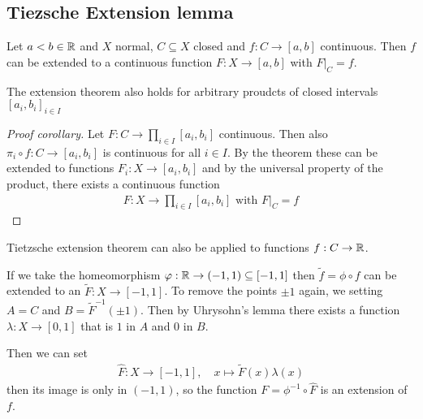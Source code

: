 \subsection{Tiezsche Extension lemma}

\begin{thm}
  Let $a < b \in \mathbb{R}$ and $X$ normal, $C \subseteq X$ closed and $f: C \to [a,b]$ continuous.
  Then $f$ can be extended to a continuous function $F:X \to [a,b]$ with $F|_C = f$.
\end{thm}
\begin{cor}[]
  The extension theorem also holds for arbitrary proudcts of closed intervals $[a_i,b_i]_{i \in I}$
\end{cor}

\begin{proof}[Proof corollary]
  Let $F: C \to \prod_{i \in I}[a_i,b_i]$ continuous.
  Then also $\pi_i \circ f: C \to [a_i,b_i]$ is continuous for all $i \in I$. 
  By the theorem these can be extended to functions $F_i: X \to  [a_i,b_i]$ and by the universal property of the product, there exists a continuous function
  \begin{align*}
    F: X \to \prod_{i \in I}[a_i,b_i] \text{ with }F|_C = f
  \end{align*}
\end{proof}


\begin{cor}[]
Tietzsche extension theorem can also be applied to functions $f: C \to \mathbb{R}$.
\end{cor}
If we take the homeomorphism $\varphi: \mathbb{R} \to (-1,1) \subseteq [-1,1]$ then $\tilde{f} = \phi \circ f$ can be extended to an $\tilde{F}: X \to [-1,1]$.
To remove the points $\pm 1$ again, we 
setting $A = C$ and $B = \tilde{F}^{-1}(\pm 1)$.
Then by Uhrysohn's lemma there exists a function $\lambda: X \to [0,1]$ that is $1$ in $A$ and $0$ in $B$.

Then we can set
\begin{align*}
  \hat{F}: X \to  [-1,1], \quad x \mapsto  \tilde{F}(x) \lambda(x)
\end{align*}
then its image is only in $(-1,1)$, so the function $F = \phi^{-1}\circ\hat{F}$ is an extension of $f$.


